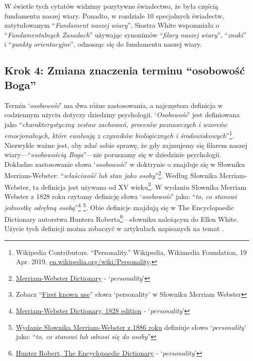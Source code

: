 W świetle tych cytatów widzimy pozytywne świadectwo, że  była częścią fundamentu naszej wiary. Ponadto, w rozdziale 10 specjalnych świadectw, zatytułowanym “\textit{Fundament naszej wiary}”, Siostra White wspomniała o “\textit{Fundamentalnych Zasadach}” używając synonimów “\textit{filary naszej wiary}”, “\textit{znaki}” i “\textit{punkty orientacyjne}”, odnosząc się do fundamentu naszej wiary.

\subsection*{Krok 4: Zmiana znaczenia terminu “osobowość Boga”}

Termin ‘\textit{osobowość}’ ma dwa różne zastosowania, a najczęstsza definicja w codziennym użyciu dotyczy dziedziny psychologii. ‘\textit{Osobowość}’ jest definiowana jako “\textit{charakterystyczny zestaw zachowań, procesów poznawczych i wzorców emocjonalnych, które ewoluują z czynników biologicznych i środowiskowych}”\footnote{Wikipedia Contributors. “Personality.” Wikipedia, Wikimedia Foundation, 19 Apr. 2019, \href{https://en.wikipedia.org/wiki/Personality}{en.wikipedia.org/wiki/Personality}.}. Niezwykle ważne jest, aby zdać sobie sprawę, że gdy zajmujemy się filarem naszej wiary—“\textit{osobowością Boga}”—nie poruszamy się w dziedzinie psychologii. Dokładne zastosowanie słowa ‘\textit{osobowość}’ w doktrynie o  znajduje się w Słowniku Merriam-Webster: “\textit{właściwość lub stan jako osoby}”\footnote{\href{https://www.merriam-webster.com/dictionary/personality}{Merriam-Webster Dictionary} - ‘\textit{personality}’}. Według Słownika Merriam-Webster, ta definicja jest używana od XV wieku\footnote{Zobacz “\href{https://www.merriam-webster.com/dictionary/personality\#word-history}{First known use}” słowa ‘personality’ w Słowniku Merriam Webster}. W wydaniu Słownika Merriam Webster z 1828 roku czytamy definicję słowa ‘\textit{osobowość}’ jako: “\textit{to, co stanowi jednostkę odrębną osobą}”\footnote{\href{https://archive.org/details/americandictiona02websrich/page/272/mode/2up}{Merriam-Webster Dictionary, 1828 edition} - ‘\textit{personality}’} \footnote{\href{https://archive.org/details/websterscomplete00webs/page/974/mode/2up}{Wydanie Słownika Merriam-Webster z 1886 roku} definiuje słowo ‘\textit{personality}’ jako: “\textit{to, co stanowi lub odnosi się do osoby}”}. Obie definicje znajdują się w The Encyclopaedic Dictionary autorstwa Huntera Roberta\footnote{\href{https://babel.hathitrust.org/cgi/pt?id=mdp.39015050663213&view=1up&seq=780}{Hunter Robert, The Encyclopaedic Dictionary} - ‘\textit{personality}’}—słowniku należącym do Ellen White. Użycie tych definicji można zobaczyć w artykułach napisanych na temat .

